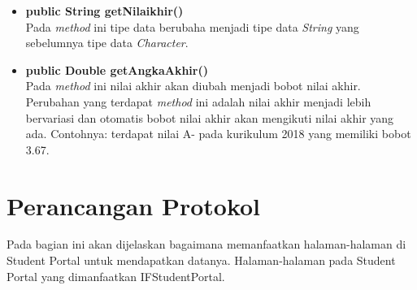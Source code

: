 \begin{enumerate}
\begin{itemize}
\begin{itemize}
					\item \textbf{public String getNilaikhir()}\\
						Pada \textit{method} ini tipe data berubaha menjadi tipe data \textit{String} yang sebelumnya tipe data \textit{Character}.
					
					\item \textbf{public Double getAngkaAkhir()}\\
						Pada \textit{method} ini nilai akhir akan diubah menjadi bobot nilai akhir. Perubahan yang terdapat \textit{method} ini adalah nilai akhir menjadi lebih bervariasi dan otomatis bobot nilai akhir akan mengikuti nilai akhir yang ada. Contohnya: terdapat nilai A- pada kurikulum 2018 yang memiliki bobot 3.67. 
				\end{itemize}
		\end{itemize}
\end{enumerate}

\section{Perancangan Protokol}
Pada bagian ini akan dijelaskan bagaimana memanfaatkan halaman-halaman di Student Portal untuk mendapatkan datanya. Halaman-halaman pada Student Portal yang dimanfaatkan IFStudentPortal.
